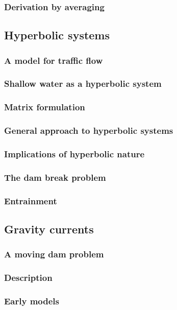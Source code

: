 \subsubsection{Derivation by averaging}

\subsection{Hyperbolic systems}
\subsubsection{A model for traffic flow}
\subsubsection{Shallow water as a hyperbolic system}
\subsubsection{Matrix formulation}
\subsubsection{General approach to hyperbolic systems}
\subsubsection{Implications of hyperbolic nature}
\subsubsection{The dam break problem}
\subsubsection{Entrainment}

\clearpage

\subsection{Gravity currents}
\subsubsection{A moving dam problem}
\subsubsection{Description}
\subsubsection{Early models}
